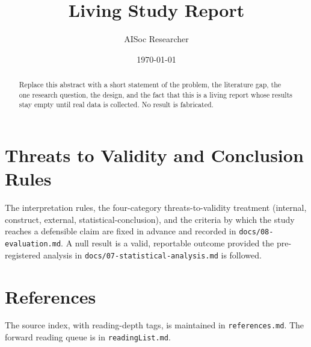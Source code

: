 \documentclass[11pt]{article}
\title{Living Study Report}
\author{AISoc Researcher}
\date{\today}
\begin{document}
\maketitle

\begin{abstract}
Replace this abstract with a short statement of the problem, the literature gap,
the one research question, the design, and the fact that this is a living report
whose results stay empty until real data is collected. No result is fabricated.
\end{abstract}

\tableofcontents





\section{Threats to Validity and Conclusion Rules}
The interpretation rules, the four-category threats-to-validity treatment
(internal, construct, external, statistical-conclusion), and the criteria by
which the study reaches a defensible claim are fixed in advance and recorded in
\texttt{docs/08-evaluation.md}. A null result is a valid, reportable outcome
provided the pre-registered analysis in \texttt{docs/07-statistical-analysis.md}
is followed.

\section*{References}
The source index, with reading-depth tags, is maintained in
\texttt{references.md}. The forward reading queue is in \texttt{readingList.md}.
\end{document}
